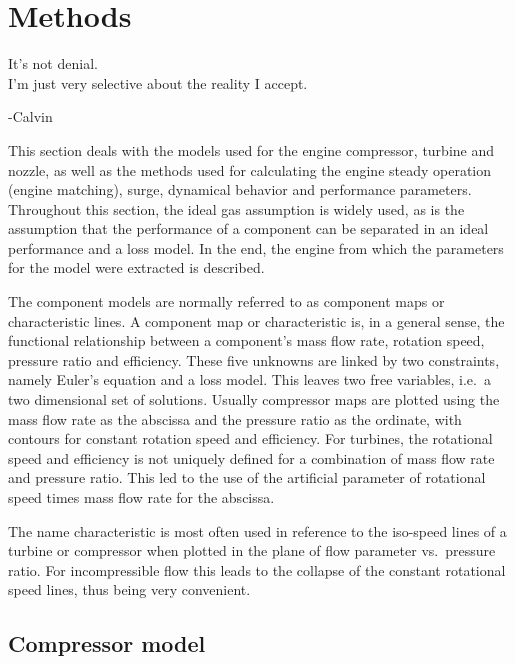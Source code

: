 \documentclass[tcc]{subfiles}
\begin{document}
\chapter{Methods}
\label{sec:methods}
\epigraph{It's not denial. \\ I'm just very selective about the reality I accept.}{-Calvin}

This section deals with the models used for the engine compressor, turbine and nozzle, 
as well as the methods used for calculating the engine steady operation (engine matching), 
surge, dynamical behavior and performance parameters. 
Throughout this section, the ideal gas assumption is widely used, 
as is the assumption that the performance of a component can be separated in an ideal performance and a loss model. 
In the end, the engine from which the parameters for the model were extracted is described.

The component models are normally referred to as component maps or characteristic lines. 
A component map or characteristic is, in a general sense, the functional relationship between a component's
mass flow rate, rotation speed, pressure ratio and efficiency. 
These five unknowns are linked by two constraints, namely Euler's equation and a loss model. 
This leaves two free variables, i.e.\ a two dimensional set of solutions.
Usually compressor maps are plotted using the mass flow rate as the abscissa and  the pressure ratio as the ordinate, with contours for constant rotation speed and efficiency. 
For turbines, the rotational speed and efficiency is not uniquely defined for a combination of mass flow rate and pressure ratio. This led to the use of the artificial parameter of rotational speed times mass flow rate for the abscissa.

The name characteristic is most often used in reference to the iso-speed lines of a turbine or compressor when plotted in the plane of flow parameter vs.\ pressure ratio.
For incompressible flow this leads to the collapse of the constant rotational speed lines, thus being very convenient.

\section{Compressor model}


\end{document}
